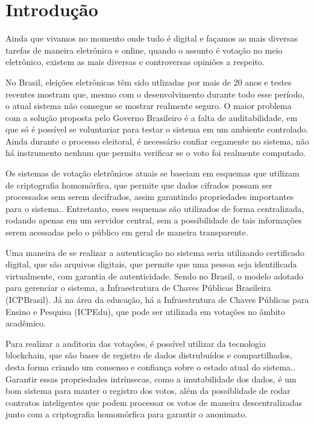 \documentclass{ufsctex/ufsctex}
\begin{document}
\capa{}

\pretextuais{}

\listadefiguras{}

\listadetabelas{}

\listadeabreviaturas{}

\listadesimbolos{}

\sumario{}

\chapter{Introdução} Ainda que vivamos no momento onde tudo é digital e façamos
as mais diversas tarefas de maneira eletrônica e online, quando o assunto é
votação no meio eletrônico, existem as mais diversas e controversas opiniões a
respeito.

No Brasil, eleições eletrônicas têm sido utlizadas por mais de 20 anos e testes
recentes mostram que, mesmo com o desenvolvimento durante todo esse período, o
atual sistema não consegue se mostrar realmente seguro\cite{aranha}. O maior
problema com a solução proposta pelo Governo Brasileiro é a falta de
auditabilidade, em que só é possível se voluntariar para testar o sistema em um
ambiente controlado. Ainda durante o processo eleitoral, é necessário confiar
cegamente no sistema, não há instrumento nenhum que permita verificar se o voto
foi realmente computado.

Os sistemas de votação eletrônicos atuais se baseiam em esquemas que utilizam de
criptografia homomórfica, que permite que dados cifrados possam ser processados
sem serem decifrados, assim garantindo propriedades importantes para o
sistema.\cite{springer}. Entretanto, esses esquemas são utilizados de forma
centralizada, rodando apenas em um servidor central, sem a possibilidade de tais
informações serem acessadas pelo o público em geral de maneira transparente.

Uma maneira de se realizar a autenticação no sistema seria utilizando
certificado digital, que são arquivos digitais, que permite que uma pessoa seja
identificada virtualmente, com garantia de autenticidade\cite{pki}. Sendo no
Brasil, o modelo adotado para gerenciar o sistema, a Infraestrutura de Chaves
Públicas Brasileira (ICPBrasil). Já na área da educação, há a Infraestrutura de
Chaves Públicas para Ensino e Pesquisa (ICPEdu), que pode ser utilizada em
votações no âmbito acadêmico.

Para realizar a auditoria das votações, é possível utilizar da tecnologia
blockchain, que são bases de registro de dados distrubuídos e compartilhados,
desta forma criando um consenso e confiança sobre o estado atual do
sistema.\cite{nakamoto2012bitcoin}.  Garantir essas propriedades intrínsecas,
como a imutabilidade dos dados, é um bom sistema para manter o registro dos
votos, além da possiblidade de rodar contratos inteligentes que podem processar
os votos de maneira descentralizadas junto com a criptografia homomórfica para
garantir o anonimato.
\end{document}
